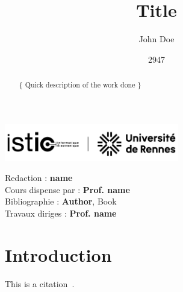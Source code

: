 \documentclass{config/ISTICUR}
\title{\fontfamily{phv}\selectfont \textbf{Title}}
\date{2947}
\author{John Doe}
\begin{document}
    \begin{titlepage}
        \maketitle
        \center\includegraphics[width=3in]{assets/logos/ISTIC/PNG/noir}

        \begin{abstract}
            \{
            Quick description of the work done
            \}
        \end{abstract}
        \vspace{5em}

        \newpage

        \tableofcontents

        \vspace{5em}

        \begin{contributors}
            \vspace{.25em}
            Redaction : \textbf{name} \\
            Cours dispense par : \textbf{Prof. name} \\
            Bibliographie : \textbf{Author}, Book\\
            Travaux diriges : \textbf{Prof. name} \\
            \vspace{.25em}
        \end{contributors}

    \end{titlepage}

    \chapter{Introduction}\label{ch:introduction}
    This is a citation~\cite{ahu61}.

    
    
\end{document}
